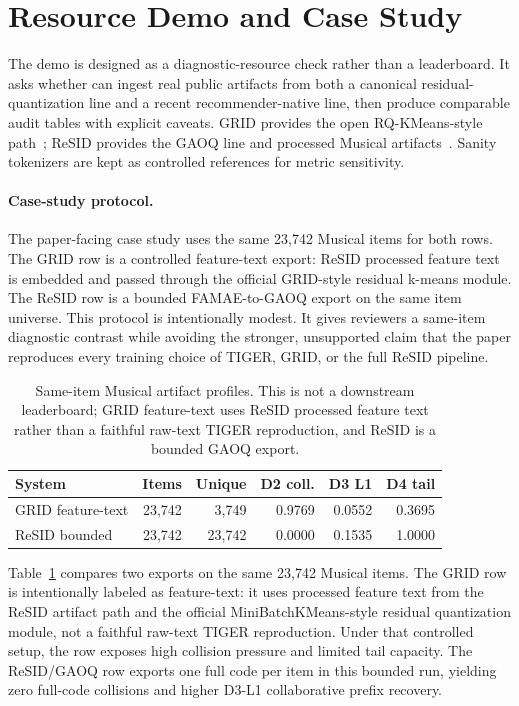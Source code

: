 \section{Resource Demo and Case Study}

The demo is designed as a diagnostic-resource check rather than a leaderboard.
It asks whether \tool can ingest real public \sid artifacts from both a
canonical residual-quantization line and a recent recommender-native line, then
produce comparable audit tables with explicit caveats. GRID provides the
open RQ-KMeans-style path~\cite{ju2025grid}; ReSID provides the GAOQ line and
processed Musical artifacts~\cite{liang2026resid}. Sanity tokenizers are kept
as controlled references for metric sensitivity.

\paragraph{Case-study protocol.}
The paper-facing case study uses the same 23,742 Musical items for both rows.
The GRID row is a controlled feature-text export: ReSID processed feature text
is embedded and passed through the official GRID-style residual k-means module.
The ReSID row is a bounded FAMAE-to-GAOQ export on the same item universe. This
protocol is intentionally modest. It gives reviewers a same-item diagnostic
contrast while avoiding the stronger, unsupported claim that the paper
reproduces every training choice of TIGER, GRID, or the full ReSID pipeline.

\begin{table}[t]
\caption{Same-item Musical artifact profiles. This is not a downstream
leaderboard; GRID feature-text uses ReSID processed feature text rather than a
faithful raw-text TIGER reproduction, and ReSID is a bounded GAOQ export.}
\label{tab:musical-diagnostic}
\small
\setlength{\tabcolsep}{2.2pt}
\begin{tabular}{@{}lrrrrr@{}}
\toprule
System & Items & Unique & D2 coll. & D3 L1 & D4 tail \\
\midrule
GRID feature-text & 23,742 & 3,749 & 0.9769 & 0.0552 & 0.3695 \\
ReSID bounded & 23,742 & 23,742 & 0.0000 & 0.1535 & 1.0000 \\
\bottomrule
\end{tabular}
\end{table}

Table~\ref{tab:musical-diagnostic} compares two exports on the same 23,742
Musical items. The GRID row is intentionally labeled as feature-text: it uses
processed feature text from the ReSID artifact path and the official
MiniBatchKMeans-style residual quantization module, not a faithful raw-text
TIGER reproduction. Under that controlled setup, the row exposes high collision
pressure and limited tail capacity. The ReSID/GAOQ row exports one full code
per item in this bounded run, yielding zero full-code collisions and higher
D3-L1 collaborative prefix recovery.

